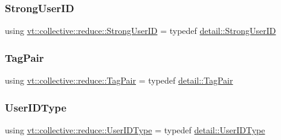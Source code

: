 \mbox{\label{namespacevt_1_1collective_1_1reduce_a49e47347201b1b0fdb552ed4b7c86331}} 
\subsubsection{\texorpdfstring{Strong\+User\+ID}{StrongUserID}}
{\footnotesize\ttfamily using \hyperlink{namespacevt_1_1collective_1_1reduce_a49e47347201b1b0fdb552ed4b7c86331}{vt\+::collective\+::reduce\+::\+Strong\+User\+ID} = typedef \hyperlink{namespacevt_1_1collective_1_1reduce_1_1detail_af9e42b20d1be7dccc1b5e587f0387e02}{detail\+::\+Strong\+User\+ID}}

\mbox{\label{namespacevt_1_1collective_1_1reduce_ae3111ccd7e2214f079222e4c016b6652}} 
\subsubsection{\texorpdfstring{Tag\+Pair}{TagPair}}
{\footnotesize\ttfamily using \hyperlink{namespacevt_1_1collective_1_1reduce_ae3111ccd7e2214f079222e4c016b6652}{vt\+::collective\+::reduce\+::\+Tag\+Pair} = typedef \hyperlink{structvt_1_1collective_1_1reduce_1_1detail_1_1_tag_pair}{detail\+::\+Tag\+Pair}}

\mbox{\label{namespacevt_1_1collective_1_1reduce_a6cdf1adaf7aedc9df00c92fe55cdcecd}} 
\subsubsection{\texorpdfstring{User\+I\+D\+Type}{UserIDType}}
{\footnotesize\ttfamily using \hyperlink{namespacevt_1_1collective_1_1reduce_a6cdf1adaf7aedc9df00c92fe55cdcecd}{vt\+::collective\+::reduce\+::\+User\+I\+D\+Type} = typedef \hyperlink{namespacevt_1_1collective_1_1reduce_1_1detail_ae82d7b96b0885b9b7dfb0104398beead}{detail\+::\+User\+I\+D\+Type}}



